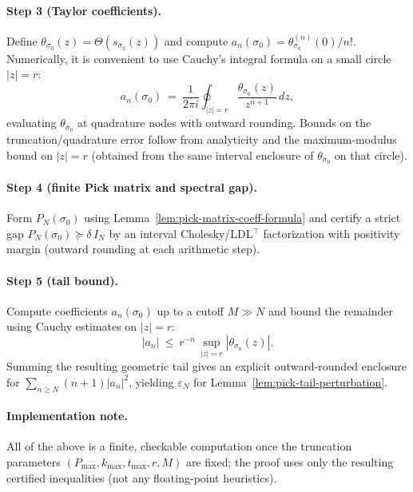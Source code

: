 \documentclass[11pt]{article}
\theoremstyle{definition}
\theoremstyle{remark}
\theoremstyle{definition}
\begin{document}
\paragraph{Step 3 (Taylor coefficients).}
Define $\theta_{\sigma_0}(z)=\Theta(s_{\sigma_0}(z))$ and compute $a_n(\sigma_0)=\theta_{\sigma_0}^{(n)}(0)/n!$.
Numerically, it is convenient to use Cauchy's integral formula on a small circle $|z|=r$:
\[
  a_n(\sigma_0)\ =\ \frac{1}{2\pi i}\oint_{|z|=r}\frac{\theta_{\sigma_0}(z)}{z^{n+1}}\,dz,
\]
evaluating $\theta_{\sigma_0}$ at quadrature nodes with outward rounding. Bounds on the truncation/quadrature error follow from analyticity and the maximum-modulus bound on $|z|=r$ (obtained from the same interval enclosure of $\theta_{\sigma_0}$ on that circle).

\paragraph{Step 4 (finite Pick matrix and spectral gap).}
Form $P_{N}(\sigma_0)$ using Lemma~\ref{lem:pick-matrix-coeff-formula} and certify a strict gap
\(
P_N(\sigma_0)\succeq \delta\,I_N
\)
by an interval Cholesky/LDL$^\top$ factorization with positivity margin (outward rounding at each arithmetic step).

\paragraph{Step 5 (tail bound).}
Compute coefficients $a_n(\sigma_0)$ up to a cutoff $M\gg N$ and bound the remainder using Cauchy estimates on $|z|=r$:
\[
  |a_n|\ \le\ r^{-n}\,\sup_{|z|=r}|\theta_{\sigma_0}(z)|.
\]
Summing the resulting geometric tail gives an explicit outward-rounded enclosure for
$\sum_{n\ge N}(n+1)|a_n|^2$, yielding $\varepsilon_N$ for Lemma~\ref{lem:pick-tail-perturbation}.

\paragraph{Implementation note.}
All of the above is a finite, checkable computation once the truncation parameters $(P_{\max},k_{\max},t_{\max},r,M)$ are fixed; the proof uses only the resulting certified inequalities (not any floating-point heuristics).
\end{document}
